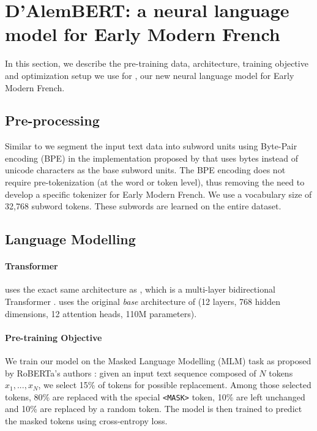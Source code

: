 \section{D'AlemBERT: a neural language model for Early Modern French}\label{sec:dAlemBERT}
In this section, we describe the pre-training data, architecture, training objective and optimization setup we use for \dalembert, our new neural language model for Early Modern French.

\subsection{Pre-processing}
Similar to \roberta \citep{liu-etal-2019-roberta} we segment the input text data into subword units using Byte-Pair encoding (BPE) \citep{sennrich-etal-2016-neural} in the implementation proposed by \citep{radford-etal-2019-language} that uses bytes instead of unicode characters as the base subword units. The BPE encoding does not require pre-tokenization (at the word or token level), thus removing the need to develop a specific tokenizer for Early Modern French. We use a vocabulary size of 32,768 subword tokens. These subwords are learned on the entire \freemmax dataset.

\subsection{Language Modelling}

\paragraph{Transformer}
\dalembert uses the exact same architecture as \roberta, which is a multi-layer bidirectional Transformer \citep{vaswani-etal-2017-attention}. \dalembert uses the original \emph{base} architecture of \roberta (12 layers, 768 hidden dimensions, 12 attention heads, 110M parameters).

\paragraph{Pre-training Objective}
We train our model on the Masked Language Modelling (MLM) task as proposed by RoBERTa's authors \citep{liu-etal-2019-roberta}: given an input text sequence composed of $N$ tokens $x_1, ..., x_N$, we select 15\% of tokens for possible replacement. Among those selected tokens, 80\% are replaced with the special \texttt{<MASK>} token, 10\% are left unchanged and 10\% are replaced by a random token. The model is then trained to predict the masked tokens using cross-entropy loss.

